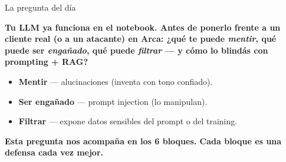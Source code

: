 \documentclass[aspectratio=169, 11pt]{beamer}
\begin{document}
\begin{frame}[shrink]{La pregunta del día}
  \vspace{10pt}
  \begin{center}
  \begin{tcolorbox}[colback=arcaDark, colframe=arcaDark, sharp corners,
    boxrule=0pt, left=14pt, right=14pt, top=10pt, bottom=10pt, width=0.92\textwidth]
    {\normalsize\color{white}\bfseries
    Tu LLM ya funciona en el notebook. Antes de ponerlo frente a un cliente real
    (o a un atacante) en Arca: ¿qué te puede \emph{mentir}, qué puede ser
    \emph{engañado}, qué puede \emph{filtrar} --- y cómo lo blindás con
    prompting + RAG?\par}
  \end{tcolorbox}
  \end{center}
  \vspace{12pt}
  \begin{itemize}\setlength{\itemsep}{4pt}
    \footnotesize
    \item \textbf{Mentir} --- alucinaciones (inventa con tono confiado).
    \item \textbf{Ser engañado} --- prompt injection (lo manipulan).
    \item \textbf{Filtrar} --- expone datos sensibles del prompt o del training.
  \end{itemize}
  \vspace{6pt}
  \begin{tcolorbox}[colback=arcaRed!8, colframe=arcaRed, leftrule=3pt,
    boxrule=0pt, sharp corners, left=8pt, right=8pt, top=4pt, bottom=4pt]
    {\footnotesize\color{arcaDark}\bfseries
    Esta pregunta nos acompaña en los 6 bloques. Cada bloque es una defensa cada vez mejor.}
  \end{tcolorbox}
\end{frame}
\end{document}
